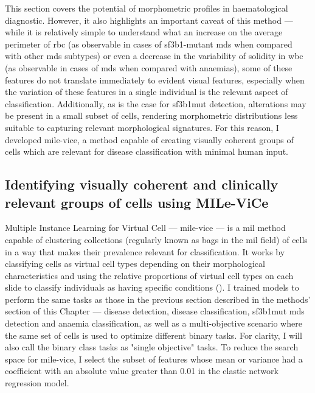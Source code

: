 This section covers the potential of morphometric profiles in haematological diagnostic. However, it also highlights an important caveat of this method --- while it is relatively simple to understand what an increase on the average perimeter of \ac{rbc} (as observable in cases of \ac{sf3b1}-mutant \ac{mds} when compared with other \ac{mds} subtypes) or even a decrease in the variability of solidity in \ac{wbc} (as observable in cases of \ac{mds} when compared with anaemias), some of these features do not translate immediately to evident visual features, especially when the variation of these features in a single individual is the relevant aspect of classification. Additionally, as is the case for \ac{sf3b1}mut detection, alterations may be present in a small subset of cells, rendering morphometric distributions less suitable to capturing relevant morphological signatures. For this reason, I developed \ac{mile-vice}, a method capable of creating visually coherent groups of cells which are relevant for disease classification with minimal human input.

\subsection{Identifying visually coherent and clinically relevant groups of cells using MILe-ViCe}

Multiple Instance Learning for Virtual Cell --- \ac{mile-vice} --- is a \ac{mil} method capable of clustering collections (regularly known as bags in the \ac{mil} field) of cells in a way that makes their prevalence relevant for classification. It works by classifying cells as virtual cell types depending on their morphological characteristics and using the relative proportions of virtual cell types on each slide to classify individuals as having specific conditions (). I trained models to perform the same tasks as those in the previous section described in the methods' section of this Chapter ---  disease detection, disease classification, \ac{sf3b1}mut \ac{mds} detection and anaemia classification, as well as a multi-objective scenario where the same set of cells is used to optimize different binary tasks. For clarity, I will also call the binary class tasks as "single objective" tasks. To reduce the search space for \ac{mile-vice}, I select the subset of features whose mean or variance had a coefficient with an absolute value greater than 0.01 in the elastic network regression model.

\begin{figure}[!ht]
    \label{fig:mile-vice-schematic}
\end{figure}

